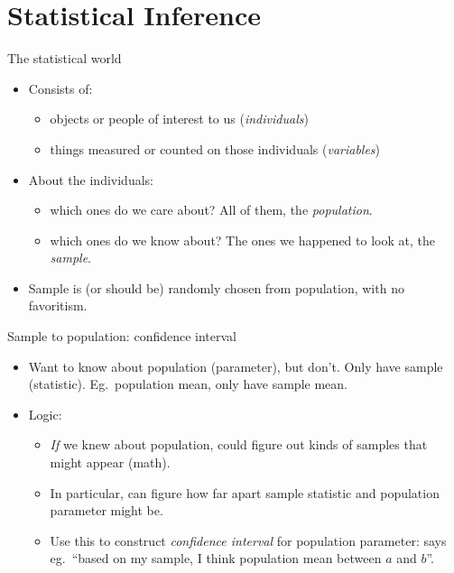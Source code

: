 \documentclass[pdf]{prosper}
\begin{document}
\part{Statistical Inference}

\begin{slide}{The statistical world}
  \begin{itemize}
  \item 
  Consists of:

  \begin{itemize}
  \item objects or people of interest to us ({\em individuals})
  \item things measured or counted on those individuals ({\em variables})
  \end{itemize}

\vspace{3ex}

\item About the individuals:

\begin{itemize}
\item which ones do we care about? All of them, the {\em population}.
\item which ones do we know about? The ones we happened to look at, the {\em sample}.
\end{itemize}

\vspace{3ex}

\item Sample is (or should be) randomly chosen from population, with no favoritism.
  \end{itemize}

\end{slide}

\begin{slide}{Sample to population: confidence interval}
  
  \begin{itemize}
  \item 
Want to know about population (parameter), but don't. Only have sample (statistic). Eg.\ population mean, only have sample mean.
\item Logic:
  \begin{itemize}
  \item {\em If} we knew about population, could figure out kinds of samples that might appear (math).
  \item In particular, can figure how far apart sample statistic and population parameter might be.
  \item Use this to construct {\em confidence interval} for population parameter: says eg.\ ``based on my sample, I think population mean between $a$ and $b$''. 
  \end{itemize}
\end{itemize}
\end{slide}
\end{document}
